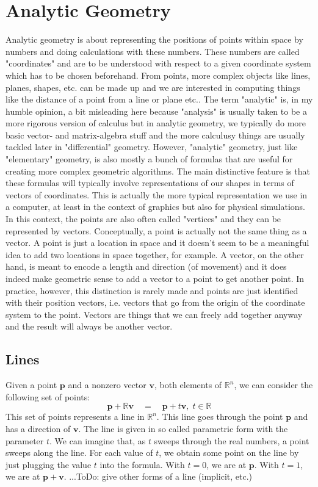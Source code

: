\section{Analytic Geometry}
Analytic geometry is about representing the positions of points within space by numbers and doing calculations with these numbers. These numbers are called "coordinates" and are to be understood with respect to a given coordinate system which has to be chosen beforehand. From points, more complex objects like lines, planes, shapes, etc. can be made up and we are interested in computing things like the distance of a point from a line or plane etc.. The term "analytic" is, in my humble opinion, a bit misleading here because "analysis" is usually taken to be a more rigorous version of calculus but in analytic geometry, we typically do more basic vector- and matrix-algebra stuff and the more calculusy things are usually tackled later in "differential" geometry. However, "analytic" geometry, just like "elementary" geometry, is also mostly a bunch of formulas that are useful for creating more complex geometric algorithms. The main distinctive feature is that these formulas will typically involve representations of our shapes in terms of vectors of coordinates. This is actually the more typical representation we use in a computer, at least in the context of graphics but also for physical simulations. In this context, the points are also often called "vertices" and they can be represented by vectors. Conceptually, a point is actually not the same thing as a vector. A point is just a location in space and it doesn't seem to be a meaningful idea to add two locations in space together, for example. A vector, on the other hand, is meant to encode a length and direction (of movement) and it does indeed make geometric sense to add a vector to a point to get another point. In practice, however, this distinction is rarely made and points are just identified with their position vectors, i.e. vectors that go from the origin of the coordinate system to the point. Vectors are things that we can freely add together anyway and the result will always be another vector.


\subsection{Lines}
Given a point $\mathbf{p}$ and a nonzero vector $\mathbf{v}$, both elements of $\mathbb{R}^n$, we can consider the following set of points:
\begin{equation}
 \mathbf{p} + \mathbb{R} \mathbf{v}
 \quad = \quad
 \mathbf{p} + t \mathbf{v}, \; t \in \mathbb{R}
\end{equation}
This set of points represents a line in $\mathbb{R}^n$. This line goes through the point $\mathbf{p}$ and has a direction of $\mathbf{v}$. The line is given in so called parametric form with the parameter $t$. We can imagine that, as $t$ sweeps through the real numbers, a point sweeps along the line. For each value of $t$, we obtain some point on the line by just plugging the value $t$ into the formula. With $t=0$, we are at $\mathbf{p}$. With $t=1$, we are at $\mathbf{p + v}$.  ...ToDo: give other forms of a line (implicit, etc.)


